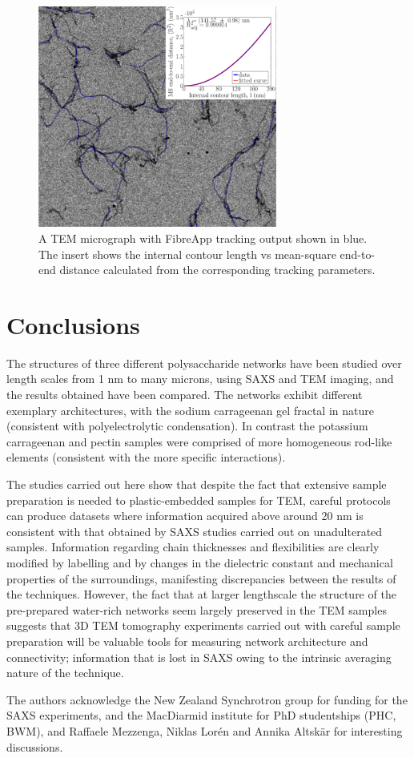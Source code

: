 \begin{figure}[!h]
    \centering
    \noindent\includegraphics[width=0.7\textwidth]{Figures/chapter-temsaxs/fibreAppTrackingImage_subplot.pdf}
    \caption{A TEM micrograph with FibreApp tracking output shown in blue. The insert shows the internal contour length vs mean-square end-to-end distance calculated from the corresponding tracking parameters.}\label{fig:fig5}
\end{figure}


\section{Conclusions}
The structures of three different polysaccharide networks have been studied over length scales from 1 nm to many microns, using SAXS and TEM imaging, and the results obtained have been compared. The networks exhibit different exemplary architectures, with the sodium carrageenan gel fractal in nature (consistent with polyelectrolytic condensation). In contrast the potassium carrageenan and pectin samples were comprised of more homogeneous rod-like elements (consistent with the more specific interactions). 


The studies carried out here show that despite the fact that extensive sample preparation is needed to plastic-embedded samples for TEM, careful protocols can produce datasets where information acquired above around 20 nm is consistent with that obtained by SAXS studies carried out on unadulterated samples. Information regarding chain thicknesses and flexibilities are clearly modified by labelling and by changes in the dielectric constant and mechanical properties of the surroundings, manifesting discrepancies between the results of the techniques. However, the fact that at larger lengthscale the structure of the pre-prepared water-rich networks seem largely preserved in the TEM samples suggests that 3D TEM tomography experiments carried out with careful sample preparation will be valuable tools for measuring network architecture and connectivity; information that is lost in SAXS owing to the intrinsic averaging nature of the technique. 

 

The authors acknowledge the New Zealand Synchrotron group for funding for the SAXS experiments, and the MacDiarmid institute for PhD studentships (PHC, BWM), and 
Raffaele Mezzenga, Niklas Lor{\'e}n and Annika Altsk{\"a}r for interesting discussions.
